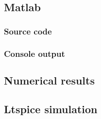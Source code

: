 \documentclass[a4paper]{article}
\begin{document}
\newpage
\clearpage
\subsection{Matlab}
\subsubsection{Source code}
%  
\subsubsection{Console output}
%  
\vspace{2mm}
\subsection{Numerical results}
\subsection{Ltspice simulation}
\clearpage
\end{document}
